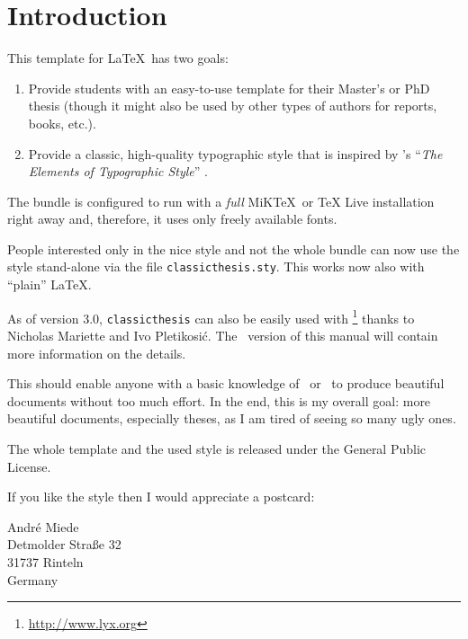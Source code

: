 
\chapter{Introduction} %

\label{ch:introduction} %


This template for \LaTeX\ has two goals:
\begin{enumerate}
\item Provide students with an easy-to-use template for their Master's or PhD thesis (though it might also be used by other types of authors for reports, books, etc.).
\item Provide a classic, high-quality typographic style that is inspired by \citeauthor{bringhurst:2002}'s ``\emph{The Elements of Typographic Style}'' \citep{bringhurst:2002}.
\marginpar{\myTitle \myVersion}
\end{enumerate}

The bundle is configured to run with a \emph{full} MiK\TeX\ or \TeX
Live installation right away and, therefore, it uses only freely
available fonts.

People interested only in the nice style and not the whole bundle can
now use the style stand-alone via the file \texttt{classicthesis.sty}.
This works now also with ``plain'' \LaTeX.

As of version 3.0, \texttt{classicthesis} can also be easily used with
\mLyX\footnote{\url{http://www.lyx.org}} thanks to Nicholas Mariette
and Ivo Pletikosi\'c. The \mLyX\ version of this manual will contain
more information on the details.

This should enable anyone with a basic knowledge of \LaTeXe\ or \mLyX\
to produce beautiful documents without too much effort. In the end,
this is my overall goal: more beautiful documents, especially theses,
as I am tired of seeing so many ugly ones.

The whole template and the used style is released under the
 General Public License.

If you like the style then I would appreciate a postcard:
\begin{center}
André Miede \\
Detmolder Straße 32 \\
31737 Rinteln \\
Germany
\end{center}

